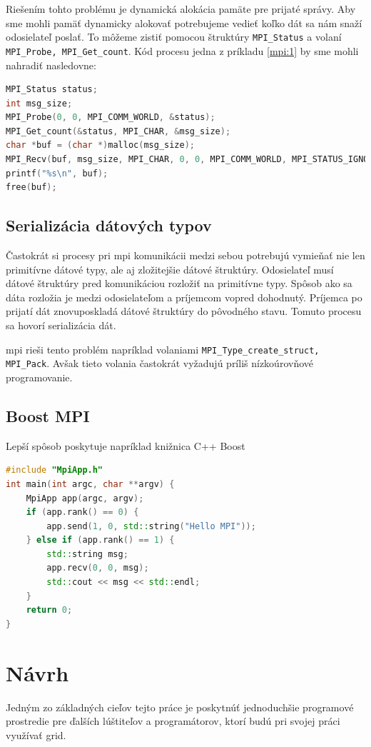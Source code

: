 Riešením tohto problému je dynamická alokácia pamäte pre prijaté správy. Aby sme mohli pamäť dynamicky alokovať potrebujeme vedieť
koľko dát sa nám snaží odosielateľ poslať. To môžeme zistiť pomocou štruktúry \texttt{MPI\_Status} a volaní \texttt{MPI\_Probe, MPI\_Get\_count}.
Kód procesu jedna z príkladu \ref{mpi:1} by sme mohli nahradiť nasledovne:
\begin{lstlisting}[language=c]
MPI_Status status;
int msg_size;
MPI_Probe(0, 0, MPI_COMM_WORLD, &status);
MPI_Get_count(&status, MPI_CHAR, &msg_size);
char *buf = (char *)malloc(msg_size);
MPI_Recv(buf, msg_size, MPI_CHAR, 0, 0, MPI_COMM_WORLD, MPI_STATUS_IGNORE);
printf("%s\n", buf);
free(buf);
\end{lstlisting}

\subsection{Serializácia dátových typov}
Častokrát si procesy pri \acrshort{mpi} komunikácii medzi sebou potrebujú vymieňať nie len primitívne dátové typy, ale aj zložitejšie dátové štruktúry.
Odosielateľ musí dátové štruktúry pred komunikáciou rozložiť na primitívne typy. Spôsob ako sa dáta rozložia je medzi odosielateľom a príjemcom vopred dohodnutý.
Príjemca po prijatí dát znovuposkladá dátové štruktúry do pôvodného stavu. Tomuto procesu sa hovorí serializácia dát.

\acrshort{mpi} rieši tento problém napríklad volaniami \texttt{MPI\_Type\_create\_struct, MPI\_Pack}.
Avšak tieto volania častokrát vyžadujú príliš nízkoúrovňové programovanie.
\subsection{Boost MPI}
Lepší spôsob poskytuje napríklad knižnica C++ Boost
\begin{lstlisting}[language=c++]
#include "MpiApp.h"
int main(int argc, char **argv) {
    MpiApp app(argc, argv);
    if (app.rank() == 0) {
        app.send(1, 0, std::string("Hello MPI"));
    } else if (app.rank() == 1) {
        std::string msg;
        app.recv(0, 0, msg);
        std::cout << msg << std::endl;
    }
    return 0;
}
\end{lstlisting}

\section{Návrh}
Jedným zo základných cieľov tejto práce je poskytnúť jednoduchšie programové prostredie pre ďalších lúštiteľov a programátorov,
ktorí budú pri svojej práci využívať grid.


